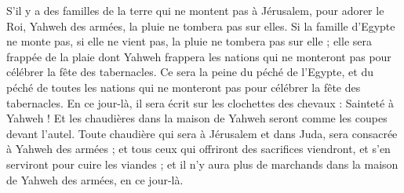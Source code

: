 \begin{multicols}{2}
S'il y a des familles de la terre qui ne montent pas à Jérusalem, pour adorer le Roi, Yahweh des armées, la pluie ne tombera pas sur elles.
Si la famille d'Egypte ne monte pas, si elle ne vient pas, la pluie ne tombera pas sur elle ; elle sera frappée de la plaie dont Yahweh frappera les nations qui ne monteront pas pour célébrer la fête des tabernacles.
Ce sera la peine du péché de l'Egypte, et du péché de toutes les nations qui ne monteront pas pour célébrer la fête des tabernacles.
En ce jour-là, il sera écrit sur les clochettes des chevaux : Sainteté à Yahweh ! Et les chaudières dans la maison de Yahweh seront comme les coupes devant l'autel.
Toute chaudière qui sera à Jérusalem et dans Juda, sera consacrée à Yahweh des armées ; et tous ceux qui offriront des sacrifices viendront, et s'en serviront pour cuire les viandes ; et il n'y aura plus de marchands dans la maison de Yahweh des armées, en ce jour-là.
\PPE{}
\end{multicols}
